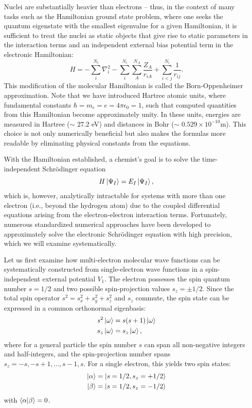 \documentclass[../main.tex]{subfiles}
\begin{document}
Nuclei are substantially heavier than electrons -- thus, in the context of many tasks such as the Hamiltonian ground state problem, where one seeks the quantum eigenstate with the smallest eigenvalue for a given Hamiltonian, it is sufficient to treat the nuclei as static objects that give rise to static parameters in the interaction terms and an independent external bias potential term in the electronic Hamiltonian:
\begin{equation}
        H =  - \sum^{N_i}_i\nabla^2_i - \sum^{N_i}_i \sum^{N_A}_{A} \frac{Z_A}{r_{iA}} + \sum^{N_i}_{i<j} \frac{1}{r_{ij}}.
\end{equation} This modification of the molecular Hamiltonian is called the Born-Oppenheimer approximation.
Note that we have introduced Hartree atomic units, where fundamental constants $\hbar = m_e = e = 4\pi\epsilon_0 = 1$, such that computed quantities from this Hamiltonian become approximately unity. In these units, energies are measured in Hartree ($\sim$ $27.2$ eV) and distances in Bohr ($\sim$ $0.529\times 10^{-10}$m). This choice is not only numerically beneficial but also makes the formulas more readable by eliminating physical constants from the equations.

With the Hamiltonian established, a chemist's goal is to solve the time-independent Schrödinger equation
\begin{equation}
    H \ket{\Psi_I} = E_I \ket{\Psi_I}, 
\end{equation} which is, however, analytically intractable for systems with more than one electron (i.e., beyond the hydrogen atom) due to the coupled differential equations arising from the electron-electron interaction terms. Fortunately, numerous standardized numerical approaches have been developed to approximately solve the electronic Schrödinger equation with high precision, which we will examine systematically. 

Let us first examine how multi-electron molecular wave functions can be systematically constructed from single-electron wave functions in a spin-independent external potential $V_1$. The electron possesses the spin quantum number $s = 1/2$ and two possible spin-projection values  $s_z = \pm 1/2$. Since the total spin operator $s^2 = s_x^2 + s_y^2 + s_z^2$ and $s_z$ commute, the spin state can be expressed in a common orthonormal eigenbasis:
\begin{align}
    s^2 \ket{\omega} &= s(s+1) \ket{\omega} \\
    s_z \ket{\omega} &= s_z \ket{\omega} , 
\end{align} where for a general particle the spin number $s$ can span all non-negative integers and half-integers, and the spin-projection number spans $s_z = { -s, -s +1, \ldots, s-1, s}$. For a single electron, this yields two spin states:
\begin{align}
    \ket{\alpha} &= \ket{s = 1/2, s_z = + 1/2} \\
    \ket{\beta} &= \ket{s = 1/2, s_z = - 1/2} \\
\end{align} with $\braket{\alpha}{\beta} = 0$.
\end{document}
